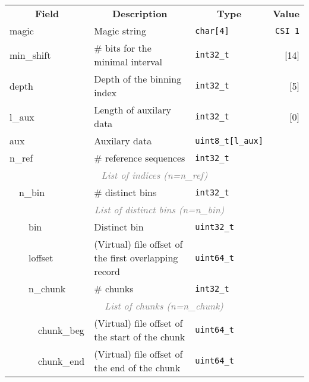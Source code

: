 \documentclass[10pt]{article}
\begin{document}
\begin{table}[h]
{\small
\begin{tabular}{|l|l|l|l|l|l|r|}
  \cline{1-7}
  \multicolumn{4}{|c|}{\bf Field} & \multicolumn{1}{c|}{\bf Description} & \multicolumn{1}{c|}{\bf Type} & \multicolumn{1}{c|}{\bf Value} \\\cline{1-7}
  \multicolumn{4}{|l|}{\sf magic} & Magic string & {\tt char[4]} & {\tt CSI\char92 1}\\\cline{1-7}
  \multicolumn{4}{|l|}{\sf min\_shift} & \# bits for the minimal interval & {\tt int32\_t} & [14]\\\cline{1-7}
  \multicolumn{4}{|l|}{\sf depth} & Depth of the binning index & {\tt int32\_t} & [5]\\\cline{1-7}
  \multicolumn{4}{|l|}{\sf l\_aux} & Length of auxilary data & {\tt int32\_t} & [0]\\\cline{1-7}
  \multicolumn{4}{|l|}{\sf aux} & Auxilary data & {\tt uint8\_t[l\_aux]} & \\\cline{1-7}
  \multicolumn{4}{|l|}{\sf n\_ref} & \# reference sequences & {\tt int32\_t} & \\\cline{1-7}
  \multicolumn{7}{|c|}{\textcolor{gray}{\it List of indices (n=n\_ref)}} \\\cline{2-7}
  & \multicolumn{3}{l|}{\sf n\_bin} & \# distinct bins & {\tt int32\_t} & \\\cline{2-7}
  & \multicolumn{6}{c|}{\textcolor{gray}{\it List of distinct bins (n=n\_bin)}} \\\cline{3-7}
  & & \multicolumn{2}{l|}{\sf bin} & Distinct bin & {\tt uint32\_t} & \\\cline{3-7}
  & & \multicolumn{2}{l|}{\sf loffset} & (Virtual) file offset of the first overlapping record & {\tt uint64\_t} & \\\cline{3-7}
  & & \multicolumn{2}{l|}{\sf n\_chunk} & \# chunks & {\tt int32\_t} & \\\cline{3-7}
  & & \multicolumn{5}{c|}{\textcolor{gray}{\it List of chunks (n=n\_chunk)}} \\\cline{4-7}
  & & & {\sf chunk\_beg} & (Virtual) file offset of the start of the chunk & {\tt uint64\_t} & \\\cline{4-7}
  & & & {\sf chunk\_end} & (Virtual) file offset of the end of the chunk & {\tt uint64\_t} & \\\cline{2-7}
  \cline{1-7}
\end{tabular}}
\end{table}
\end{document}
